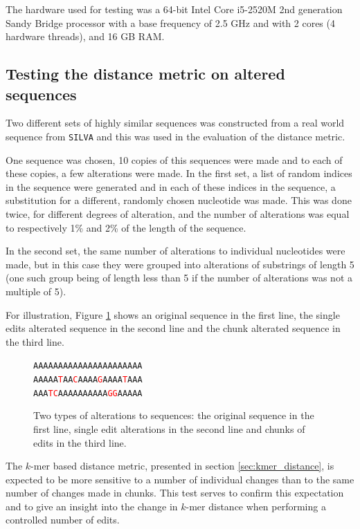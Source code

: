 The hardware used for testing was a 64-bit Intel Core i5-2520M 2nd generation
Sandy Bridge processor with a base frequency of 2.5 GHz and with 2 cores (4
hardware threads), and 16 GB RAM.


\subsection{Testing the distance metric on altered sequences}
\label{sec:altered_sequences}

Two different sets of highly similar sequences was constructed from a real
world sequence from \texttt{SILVA} and this was used in the evaluation of the
distance metric.

One sequence was chosen, 10 copies of this sequences were made and to each of
these copies, a few alterations were made. In the first set, a list of random
indices in the sequence were generated and in each of these indices in the
sequence, a substitution for a different, randomly chosen nucleotide was made.
This was done twice, for different degrees of alteration, and the number of
alterations was equal to respectively 1\% and 2\% of the length of the
sequence.

In the second set, the same number of alterations to individual nucleotides
were made, but in this case they were grouped into alterations of substrings of
length 5 (one such group being of length less than 5 if the number of
alterations was not a multiple of 5).

For illustration, Figure \ref{fig:alterations} shows an original sequence in
the first line, the single edits alterated sequence in the second line and the
chunk alterated sequence in the third line.

\newcommand{\tc}[1]{\textcolor{red}{#1}}
\begin{figure}[H]
  \centering
  \texttt{AAAAAAAAAAAAAAAAAAAAAA} \\
  \texttt{AAAAA\tc{T}AA\tc{C}AAAA\tc{G}AAAA\tc{T}AAA} \\
  \texttt{AAA\tc{TC}AAAAAAAAAA\tc{GG}AAAAA}
  \caption{Two types of alterations to sequences: the original sequence in the
    first line, single edit alterations in the second line and chunks of edits
    in the third line.}
  \label{fig:alterations}
\end{figure}

The $k$-mer based distance metric, presented in section
\ref{sec:kmer_distance}, is expected to be more sensitive to a number of
individual changes than to the same number of changes made in chunks. This test
serves to confirm this expectation and to give an insight into the change in
$k$-mer distance when performing a controlled number of edits.

